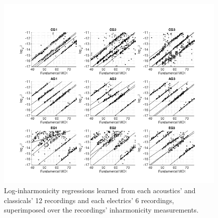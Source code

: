 \documentclass[12pt]{cmuthesis}
\begin{document}

\begin{figure}[!htbp] 
\centering
\includegraphics[scale=0.65]{regs3by3}
\caption{Log-inharmonicity regressions learned from each acoustics' and classicals' 12 recordings and each electrics' 6 recordings, superimposed over the recordings' inharmonicity measurements.}
\label{fig:regs3by3}
\end{figure}
\end{document}
